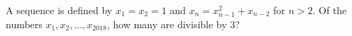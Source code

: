 A sequence is defined by $x_1=x_2=1$ and $x_n=x_{n-1}^2+x_{n-2}$ for $n>2$. Of the numbers $x_1,x_2,\dots,x_{2018}$, how many are divisible by $3$?
